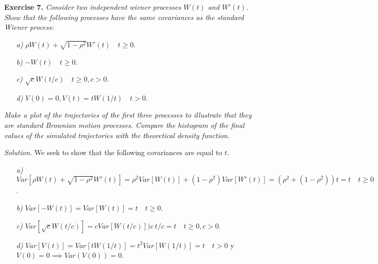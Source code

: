 
\textbf{Exercise 7. }\emph{Consider two independent wiener processes \( W(t) \) and \( W'(t) \). Show that the following processes have the same covariances as the standard Wiener process:}

\begin{itemize}
  \item[\textit{a)}] \( \rho W(t) + \sqrt{1 - \rho^{2}}W'(t)\quad t \geq 0 \).
  \item[\textit{b)}] \( -W(t) \quad t\geq 0 \).
  \item[\textit{c)}] \( \sqrt{c}W(t/c)\quad t \geq 0, c > 0 \).
  \item[\textit{d)}] \( V(0) = 0, V(t) = tW(1/t) \quad t> 0 \).
\end{itemize}
\emph{Make a plot of the trajectories of the first three processes to illustrate that they are standard Brownian motion processes. Compare the histogram of the final values of the simulated trajectories with the theoretical density function.}

\emph{Solution. } We seek to show that the following covariances are equal to \( t \).
\begin{itemize}
  \item[\textit{a)}] \( Var[\rho W(t) + \sqrt{1 - \rho^{2}}W'(t)] = \rho^{2}Var[W(t)] + (1 - \rho^{2})Var[W'(t)] = (\rho^{2} + ( 1 - \rho^{2} ))t = t \quad t \geq 0 \).
  \item[\textit{b)}] \( Var[-W(t)] = Var[W(t)] = t \quad t\geq 0 \).
  \item[\textit{c)}] \( Var[\sqrt{c}W(t/c)] = cVar[W(t/c)] ) c\ t/c = t \quad t \geq 0, c > 0 \).
  \item[\textit{d)}] \( Var[V(t)] = Var[tW(1/t)] = t^{2}Var[W(1/t)] = t \quad t> 0 \) y \( V(0) = 0 \implies Var(V(0)) = 0 \).
\end{itemize}
